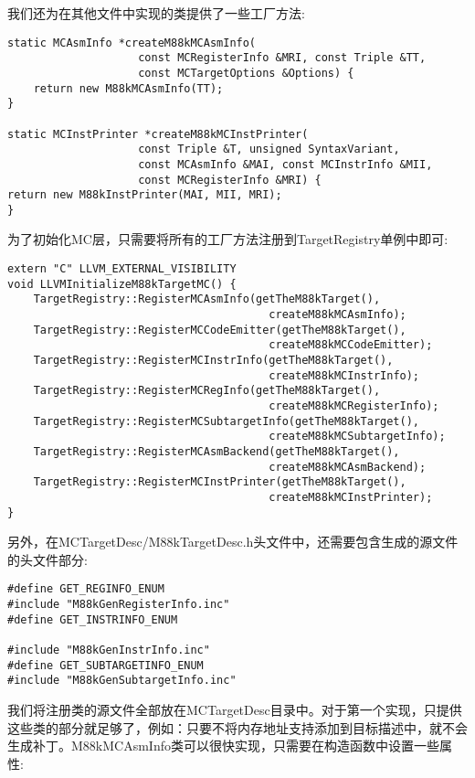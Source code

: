我们还为在其他文件中实现的类提供了一些工厂方法:\par

\begin{lstlisting}[caption={}]
static MCAsmInfo *createM88kMCAsmInfo(
					const MCRegisterInfo &MRI, const Triple &TT,
					const MCTargetOptions &Options) {
	return new M88kMCAsmInfo(TT);
}

static MCInstPrinter *createM88kMCInstPrinter(
					const Triple &T, unsigned SyntaxVariant,
					const MCAsmInfo &MAI, const MCInstrInfo &MII,
					const MCRegisterInfo &MRI) {
return new M88kInstPrinter(MAI, MII, MRI);
}
\end{lstlisting}

为了初始化MC层，只需要将所有的工厂方法注册到TargetRegistry单例中即可:\par

\begin{lstlisting}[caption={}]
extern "C" LLVM_EXTERNAL_VISIBILITY
void LLVMInitializeM88kTargetMC() {
	TargetRegistry::RegisterMCAsmInfo(getTheM88kTarget(),
										createM88kMCAsmInfo);
	TargetRegistry::RegisterMCCodeEmitter(getTheM88kTarget(),
										createM88kMCCodeEmitter);
	TargetRegistry::RegisterMCInstrInfo(getTheM88kTarget(),
										createM88kMCInstrInfo);
	TargetRegistry::RegisterMCRegInfo(getTheM88kTarget(),
										createM88kMCRegisterInfo);
	TargetRegistry::RegisterMCSubtargetInfo(getTheM88kTarget(),
										createM88kMCSubtargetInfo);
	TargetRegistry::RegisterMCAsmBackend(getTheM88kTarget(),
										createM88kMCAsmBackend);
	TargetRegistry::RegisterMCInstPrinter(getTheM88kTarget(),
										createM88kMCInstPrinter);
}
\end{lstlisting}

另外，在MCTargetDesc/M88kTargetDesc.h头文件中，还需要包含生成的源文件的头文件部分:\par

\begin{lstlisting}[caption={}]
#define GET_REGINFO_ENUM
#include "M88kGenRegisterInfo.inc"
#define GET_INSTRINFO_ENUM

#include "M88kGenInstrInfo.inc"
#define GET_SUBTARGETINFO_ENUM
#include "M88kGenSubtargetInfo.inc"
\end{lstlisting}

我们将注册类的源文件全部放在MCTargetDesc目录中。对于第一个实现，只提供这些类的部分就足够了，例如：只要不将内存地址支持添加到目标描述中，就不会生成补丁。M88kMCAsmInfo类可以很快实现，只需要在构造函数中设置一些属性:\par

